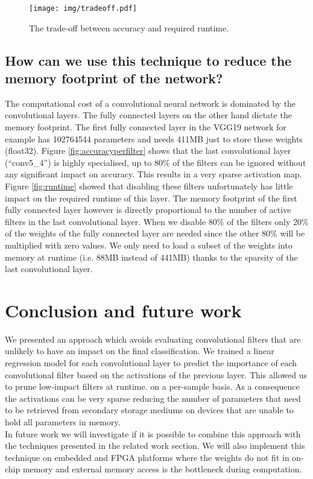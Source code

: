 \documentclass{article}
\begin{document}
\begin{figure}[h]
\begin{center}
\texttt{[image: img/tradeoff.pdf]}
\caption{The trade-off between accuracy and required runtime.}
\label{fig:tradeoff}
\end{center}
\end{figure}

\subsection{How can we use this technique to reduce the memory footprint of the network?}
\label{section_memory}
The computational cost of a convolutional neural network is dominated by the convolutional layers. The fully connected layers on the other hand dictate the memory footprint. The first fully connected layer in the VGG19 network for example has 102764544 parameters and needs 411MB just to store these weights (float32). Figure \ref{fig:accuracyperfilter} shows that the last convolutional layer (``conv5\_4'') is highly specialised, up to 80\% of the filters can be ignored without any significant impact on accuracy. This results in a very sparse activation map. Figure \ref{fig:runtime} showed that disabling these filters unfortunately has little impact on the required runtime of this layer. The memory footprint of the first fully connected layer however is directly proportional to the number of active filters in the last convolutional layer. When we disable 80\% of the filters only 20\% of the weights of the fully connected layer are needed since the other 80\% will be multiplied with zero values. We only need to load a subset of the weights into memory at runtime (i.e. 88MB instead of 441MB) thanks to the sparsity of the last convolutional layer.



\section{Conclusion and future work}
\label{conclusion and future work}
We presented an approach which avoids evaluating convolutional filters that are unlikely to have an impact on the final classification. We trained a linear regression model for each convolutional layer to predict the importance of each convolutional filter based on the activations of the previous layer. This allowed us to prune low-impact filters at runtime. on a per-sample basis. As a consequence the activations can be very sparse reducing the number of parameters that need to be retrieved from secondary storage mediums on devices that are unable to hold all parameters in memory.
\\
\newline
In future work we will investigate if it is possible to combine this approach with the techniques presented in the related work section. We will also implement this technique on embedded and FPGA platforms where the weights do not fit in on-chip memory and external memory access is the bottleneck  during computation.
\end{document}
